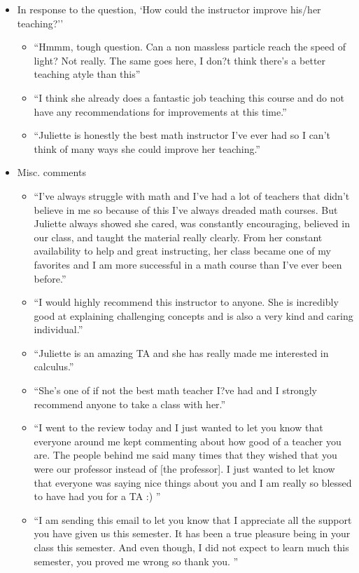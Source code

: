 \documentclass[letterpaper,11pt]{article}
\begin{document}
\begin{itemize}
\item In response to the question, `How could the instructor improve his/her teaching?''
	\begin{itemize}
		\item ``Hmmm, tough question. Can a non massless particle reach the speed of light? Not really. The same goes here, I don?t think there's a better teaching atyle than this''
		\item ``I think she already does a fantastic job teaching this course and do not have any recommendations for improvements at this time.''
		\item ``Juliette is honestly the best math instructor I've ever had so I can't think of many ways she could improve her teaching.''
	\end{itemize}

\item Misc. comments
	\begin{itemize}
		\item ``I've always struggle with math and I've had a lot of teachers that didn't believe in me so because of this I've always dreaded math courses. But Juliette always showed she cared, was constantly encouraging, believed in our class, and taught the material really clearly. From her constant availability to help and great instructing, her class became one of my favorites and I am more successful in a math course than I've ever been before.''
		\item ``I would highly recommend this instructor to anyone. She is incredibly good at explaining challenging concepts and is also a very kind and caring individual.''
		\item ``Juliette is an amazing TA and she has really made me interested in calculus.''
		\item ``She's one of if not the best math teacher I?ve had and I strongly recommend anyone to take a class with her.'' 
		\item ``I went to the review today and I just wanted to let you know that everyone around me kept commenting about how good of a teacher you are. The people behind me said many times that they wished that you were our professor instead of [the professor]. I just wanted to let know that everyone was
saying nice things about you and I am really so blessed to have had you for a TA :) ''
		\item ``I am sending this email to let you know that I appreciate all the support you have given us this semester. It has been a true pleasure being in your class this semester. And even though, I did not expect to learn much this semester, you proved me wrong so thank you. ''
	\end{itemize}
\end{itemize}
\end{document}
